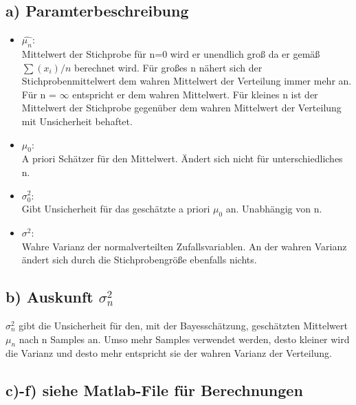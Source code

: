 \documentclass{scrartcl}
\begin{document}
\subsection*{a) Paramterbeschreibung}
\begin{itemize}
	\item $\hat{\mu_n}$:\\
	Mittelwert der Stichprobe für n=0 wird er unendlich groß da er gemäß $\sum(x_i) /n$ berechnet wird. Für großes n nähert sich der Stichprobenmittelwert dem wahren Mittelwert der Verteilung immer mehr an. Für n = $\infty$ entspricht er dem wahren Mittelwert. Für kleines n ist der Mittelwert der Stichprobe gegenüber dem wahren Mittelwert der Verteilung mit Unsicherheit behaftet.
	\item $\mu_0$:\\
	A priori Schätzer für den Mittelwert. Ändert sich nicht für unterschiedliches n. 
	\item $\sigma^2_0$:\\
	Gibt Unsicherheit für das geschätzte a priori $\mu_0$ an. Unabhängig von n.
	\item $\sigma^2$:\\
	Wahre Varianz der normalverteilten Zufallsvariablen. An der wahren Varianz ändert sich durch die Stichprobengröße ebenfalls nichts.
\end{itemize}

\subsection*{b) Auskunft $\sigma^2_n$}
$\sigma^2_n$ gibt die Unsicherheit für den, mit der Bayesschätzung, geschätzten Mittelwert $\mu_n$ nach n Samples an. Umso mehr Samples verwendet werden, desto kleiner wird die Varianz und desto mehr entspricht sie der wahren Varianz der Verteilung.

\subsection*{c)-f) siehe Matlab-File für Berechnungen}
\end{document}
